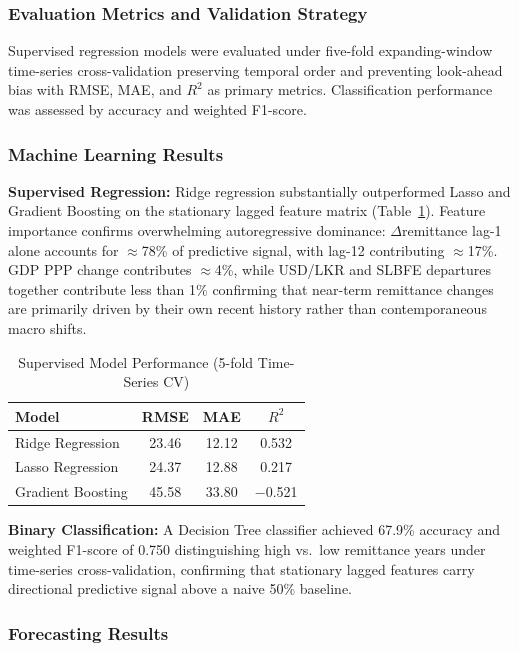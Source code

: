 \documentclass[sigconf]{acmart}
\begin{document}
\subsubsection{Evaluation Metrics and Validation Strategy}
Supervised regression models were evaluated under five-fold expanding-window time-series cross-validation preserving temporal order and preventing look-ahead bias with RMSE, MAE, and $R^2$ as primary metrics. Classification performance was assessed by accuracy and weighted F1-score.

\subsubsection{Machine Learning Results}

\noindent\textbf{Supervised Regression:}
Ridge regression substantially outperformed Lasso and Gradient Boosting on the stationary lagged feature matrix (Table~\ref{tab:ml-results}). Feature importance confirms overwhelming autoregressive dominance: $\Delta$remittance lag-1 alone accounts for $\approx$78\% of predictive signal, with lag-12 contributing $\approx$17\%. GDP PPP change contributes $\approx$4\%, while USD/LKR and SLBFE departures together contribute less than 1\% confirming that near-term remittance changes are primarily driven by their own recent history rather than contemporaneous macro shifts.

\begin{table}[h]
\centering
\caption{Supervised Model Performance (5-fold Time-Series CV)}
\label{tab:ml-results}
\small
\begin{tabular}{lccc}
\toprule
\textbf{Model} & \textbf{RMSE} & \textbf{MAE} & \textbf{$R^2$} \\
\midrule
Ridge Regression  & 23.46 & 12.12 & \phantom{$-$}0.532 \\
Lasso Regression  & 24.37 & 12.88 & \phantom{$-$}0.217 \\
Gradient Boosting & 45.58 & 33.80 & $-$0.521 \\
\bottomrule
\end{tabular}
\end{table}

\noindent\textbf{Binary Classification:}
A Decision Tree classifier achieved 67.9\% accuracy and weighted F1-score of 0.750 distinguishing high vs.\ low remittance years under time-series cross-validation, confirming that stationary lagged features carry directional predictive signal above a naive 50\% baseline.

\subsubsection{Forecasting Results}
\end{document}

